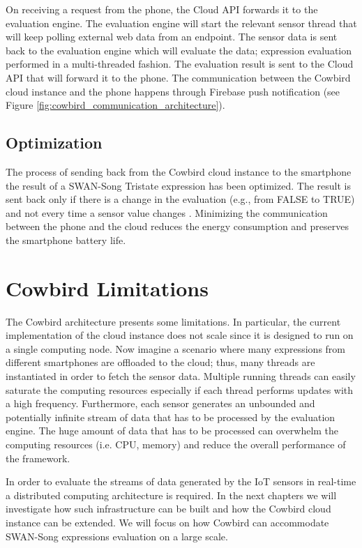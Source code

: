 On receiving a request from the phone, the Cloud API forwards it to the evaluation engine. The evaluation engine will start the relevant sensor thread that will keep polling external web data from an endpoint. The sensor data is sent back to the evaluation engine which will evaluate the data;  expression evaluation performed in a multi-threaded fashion. The evaluation result is sent to the Cloud API that will forward it to the phone.
The communication between the Cowbird cloud instance and the phone happens through Firebase push notification (see Figure \ref{fig:cowbird_communication_architecture}).
\subsection{Optimization}
The process of sending back from the Cowbird cloud instance to the smartphone the result of a SWAN-Song Tristate expression has been optimized. The result is sent back only if there is a change in the evaluation (e.g., from FALSE to TRUE) and not every time a sensor value changes \cite{cowbirdarticle}. Minimizing the communication between the phone and the cloud reduces the energy consumption and preserves the smartphone battery life.
\section{Cowbird Limitations}
The Cowbird architecture presents some limitations. In particular, the current implementation of the cloud instance does not scale since it is designed to run on a single computing node. Now imagine a scenario where many expressions from different smartphones are offloaded to the cloud; thus, many threads are instantiated in order to fetch the sensor data. Multiple running threads can easily saturate the computing resources especially if each thread performs updates with a high frequency. Furthermore, each sensor generates an unbounded and potentially infinite stream of data that has to be processed by the evaluation engine. The huge amount of data that has to be processed can overwhelm the computing resources (i.e. CPU, memory) and reduce the overall performance of the framework.

In order to evaluate the streams of data generated by the IoT sensors in real-time a distributed computing architecture is required. In the next chapters we will investigate how such infrastructure can be built and how the Cowbird cloud instance can be extended. We will focus on how Cowbird can accommodate SWAN-Song expressions evaluation on a large scale.